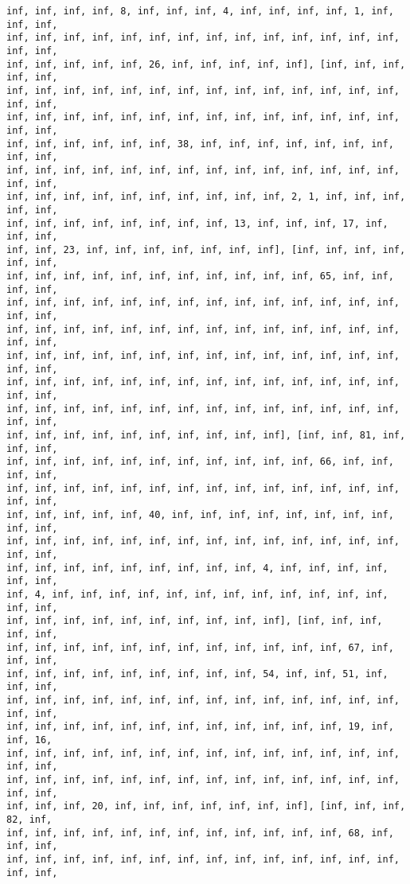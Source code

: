 \documentclass[11pt]{article}
\begin{document}
\begin{Verbatim}[commandchars=\\\{\}]
inf, inf, inf, inf, 8, inf, inf, inf, 4, inf, inf, inf, inf, 1, inf, inf, inf,
inf, inf, inf, inf, inf, inf, inf, inf, inf, inf, inf, inf, inf, inf, inf, inf,
inf, inf, inf, inf, inf, 26, inf, inf, inf, inf, inf], [inf, inf, inf, inf, inf,
inf, inf, inf, inf, inf, inf, inf, inf, inf, inf, inf, inf, inf, inf, inf, inf,
inf, inf, inf, inf, inf, inf, inf, inf, inf, inf, inf, inf, inf, inf, inf, inf,
inf, inf, inf, inf, inf, inf, 38, inf, inf, inf, inf, inf, inf, inf, inf, inf,
inf, inf, inf, inf, inf, inf, inf, inf, inf, inf, inf, inf, inf, inf, inf, inf,
inf, inf, inf, inf, inf, inf, inf, inf, inf, inf, 2, 1, inf, inf, inf, inf, inf,
inf, inf, inf, inf, inf, inf, inf, inf, 13, inf, inf, inf, 17, inf, inf, inf,
inf, inf, 23, inf, inf, inf, inf, inf, inf, inf], [inf, inf, inf, inf, inf, inf,
inf, inf, inf, inf, inf, inf, inf, inf, inf, inf, inf, 65, inf, inf, inf, inf,
inf, inf, inf, inf, inf, inf, inf, inf, inf, inf, inf, inf, inf, inf, inf, inf,
inf, inf, inf, inf, inf, inf, inf, inf, inf, inf, inf, inf, inf, inf, inf, inf,
inf, inf, inf, inf, inf, inf, inf, inf, inf, inf, inf, inf, inf, inf, inf, inf,
inf, inf, inf, inf, inf, inf, inf, inf, inf, inf, inf, inf, inf, inf, inf, inf,
inf, inf, inf, inf, inf, inf, inf, inf, inf, inf, inf, inf, inf, inf, inf, inf,
inf, inf, inf, inf, inf, inf, inf, inf, inf, inf], [inf, inf, 81, inf, inf, inf,
inf, inf, inf, inf, inf, inf, inf, inf, inf, inf, inf, 66, inf, inf, inf, inf,
inf, inf, inf, inf, inf, inf, inf, inf, inf, inf, inf, inf, inf, inf, inf, inf,
inf, inf, inf, inf, inf, 40, inf, inf, inf, inf, inf, inf, inf, inf, inf, inf,
inf, inf, inf, inf, inf, inf, inf, inf, inf, inf, inf, inf, inf, inf, inf, inf,
inf, inf, inf, inf, inf, inf, inf, inf, inf, 4, inf, inf, inf, inf, inf, inf,
inf, 4, inf, inf, inf, inf, inf, inf, inf, inf, inf, inf, inf, inf, inf, inf,
inf, inf, inf, inf, inf, inf, inf, inf, inf, inf], [inf, inf, inf, inf, inf,
inf, inf, inf, inf, inf, inf, inf, inf, inf, inf, inf, inf, 67, inf, inf, inf,
inf, inf, inf, inf, inf, inf, inf, inf, inf, 54, inf, inf, 51, inf, inf, inf,
inf, inf, inf, inf, inf, inf, inf, inf, inf, inf, inf, inf, inf, inf, inf, inf,
inf, inf, inf, inf, inf, inf, inf, inf, inf, inf, inf, inf, 19, inf, inf, 16,
inf, inf, inf, inf, inf, inf, inf, inf, inf, inf, inf, inf, inf, inf, inf, inf,
inf, inf, inf, inf, inf, inf, inf, inf, inf, inf, inf, inf, inf, inf, inf, inf,
inf, inf, inf, 20, inf, inf, inf, inf, inf, inf, inf], [inf, inf, inf, 82, inf,
inf, inf, inf, inf, inf, inf, inf, inf, inf, inf, inf, inf, 68, inf, inf, inf,
inf, inf, inf, inf, inf, inf, inf, inf, inf, inf, inf, inf, inf, inf, inf, inf,

\end{Verbatim}
\end{document}
